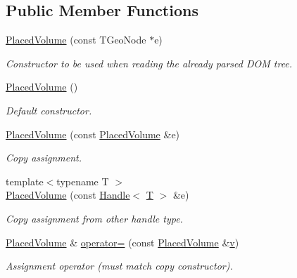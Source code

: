 \subsection*{Public Member Functions}
\begin{DoxyCompactItemize}
\item 
\hyperlink{class_d_d4hep_1_1_geometry_1_1_placed_volume_ad5ba4a479af1d8ae77357d34bb91fe00}{PlacedVolume} (const TGeoNode $\ast$e)
\begin{DoxyCompactList}\small\item\em Constructor to be used when reading the already parsed DOM tree. \item\end{DoxyCompactList}\item 
\hyperlink{class_d_d4hep_1_1_geometry_1_1_placed_volume_aa8ea9d912c9b81e33801502cafd513fb}{PlacedVolume} ()
\begin{DoxyCompactList}\small\item\em Default constructor. \item\end{DoxyCompactList}\item 
\hyperlink{class_d_d4hep_1_1_geometry_1_1_placed_volume_a1cd5673caae2e9568ea34c5076ba306b}{PlacedVolume} (const \hyperlink{class_d_d4hep_1_1_geometry_1_1_placed_volume}{PlacedVolume} \&e)
\begin{DoxyCompactList}\small\item\em Copy assignment. \item\end{DoxyCompactList}\item 
{\footnotesize template$<$typename T $>$ }\\\hyperlink{class_d_d4hep_1_1_geometry_1_1_placed_volume_af048daea3d74193f73748eb982ce68cd}{PlacedVolume} (const \hyperlink{class_d_d4hep_1_1_handle}{Handle}$<$ \hyperlink{class_t}{T} $>$ \&e)
\begin{DoxyCompactList}\small\item\em Copy assignment from other handle type. \item\end{DoxyCompactList}\item 
\hyperlink{class_d_d4hep_1_1_geometry_1_1_placed_volume}{PlacedVolume} \& \hyperlink{class_d_d4hep_1_1_geometry_1_1_placed_volume_a3bd4abac5c77adc45a1c66aff5ff4cb9}{operator=} (const \hyperlink{class_d_d4hep_1_1_geometry_1_1_placed_volume}{PlacedVolume} \&\hyperlink{_multi_view_8cpp_a8320ee13ac034dbf6d624fe8953dd337}{v})
\begin{DoxyCompactList}\small\item\em Assignment operator (must match copy constructor). \item\end{DoxyCompactList}\item 

\end{DoxyCompactItemize}
